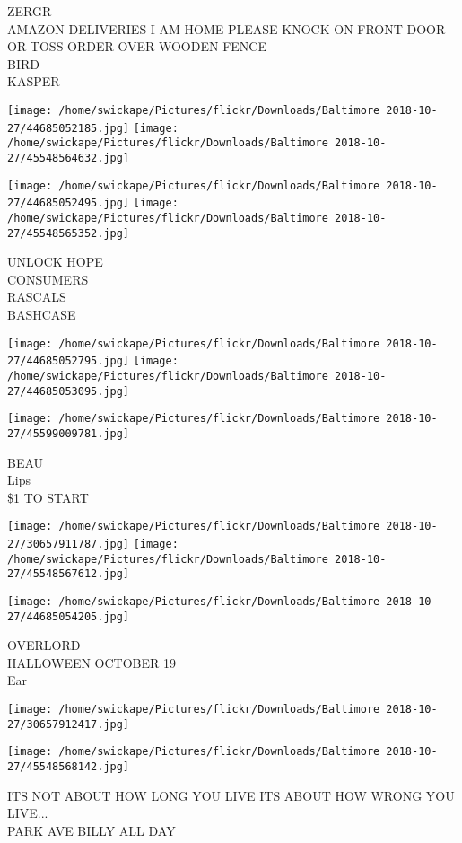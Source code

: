\documentclass[10pt,letterpaper]{article}
\begin{document}
ZERGR\\
AMAZON DELIVERIES I AM HOME PLEASE KNOCK ON FRONT DOOR OR TOSS ORDER OVER WOODEN FENCE\\
BIRD\\
KASPER\\
\pagebreak

\texttt{[image: /home/swickape/Pictures/flickr/Downloads/Baltimore 2018-10-27/44685052185.jpg]}
\texttt{[image: /home/swickape/Pictures/flickr/Downloads/Baltimore 2018-10-27/45548564632.jpg]}

\texttt{[image: /home/swickape/Pictures/flickr/Downloads/Baltimore 2018-10-27/44685052495.jpg]}
\texttt{[image: /home/swickape/Pictures/flickr/Downloads/Baltimore 2018-10-27/45548565352.jpg]}

UNLOCK HOPE\\
CONSUMERS\\
RASCALS\\
BASHCASE\\
\pagebreak

\texttt{[image: /home/swickape/Pictures/flickr/Downloads/Baltimore 2018-10-27/44685052795.jpg]}
\texttt{[image: /home/swickape/Pictures/flickr/Downloads/Baltimore 2018-10-27/44685053095.jpg]}

\vspace{0.25in}
\texttt{[image: /home/swickape/Pictures/flickr/Downloads/Baltimore 2018-10-27/45599009781.jpg]}

BEAU\\
Lips\\
\$1 TO START\\
\pagebreak

\texttt{[image: /home/swickape/Pictures/flickr/Downloads/Baltimore 2018-10-27/30657911787.jpg]}
\texttt{[image: /home/swickape/Pictures/flickr/Downloads/Baltimore 2018-10-27/45548567612.jpg]}

\vspace{0.25in}
\texttt{[image: /home/swickape/Pictures/flickr/Downloads/Baltimore 2018-10-27/44685054205.jpg]}

OVERLORD\\
HALLOWEEN OCTOBER 19\\
Ear\\
\pagebreak

\texttt{[image: /home/swickape/Pictures/flickr/Downloads/Baltimore 2018-10-27/30657912417.jpg]}

\vspace{0.25in}
\texttt{[image: /home/swickape/Pictures/flickr/Downloads/Baltimore 2018-10-27/45548568142.jpg]}

ITS NOT ABOUT HOW LONG YOU LIVE ITS ABOUT HOW WRONG YOU LIVE...\\
PARK AVE BILLY ALL DAY\\
\pagebreak
\end{document}
